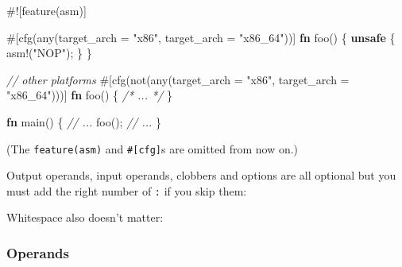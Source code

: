 \documentclass[a4paper,]{book}
\newenvironment{Shaded}{\begin{snugshade}}{\end{snugshade}}
\newcommand{\KeywordTok}[1]{\textcolor[rgb]{0.13,0.29,0.53}{\textbf{{#1}}}}
\newcommand{\StringTok}[1]{\textcolor[rgb]{0.31,0.60,0.02}{{#1}}}
\newcommand{\CommentTok}[1]{\textcolor[rgb]{0.56,0.35,0.01}{\textit{{#1}}}}
\newcommand{\OtherTok}[1]{\textcolor[rgb]{0.56,0.35,0.01}{{#1}}}
\newcommand{\NormalTok}[1]{{#1}}
\begin{document}
\begin{Shaded}
\begin{Highlighting}[]
\NormalTok{#![feature(asm)]}

\OtherTok{#[}\NormalTok{cfg}\OtherTok{(}\NormalTok{any}\OtherTok{(}\NormalTok{target_arch }\OtherTok{=} \StringTok{"x86"}\OtherTok{,} \NormalTok{target_arch }\OtherTok{=} \StringTok{"x86_64"}\OtherTok{))]}
\KeywordTok{fn} \NormalTok{foo() \{}
    \KeywordTok{unsafe} \NormalTok{\{}
        \OtherTok{asm!}\NormalTok{(}\StringTok{"NOP"}\NormalTok{);}
    \NormalTok{\}}
\NormalTok{\}}

\CommentTok{// other platforms}
\OtherTok{#[}\NormalTok{cfg}\OtherTok{(}\NormalTok{not}\OtherTok{(}\NormalTok{any}\OtherTok{(}\NormalTok{target_arch }\OtherTok{=} \StringTok{"x86"}\OtherTok{,} \NormalTok{target_arch }\OtherTok{=} \StringTok{"x86_64"}\OtherTok{)))]}
\KeywordTok{fn} \NormalTok{foo() \{ }\CommentTok{/* ... */} \NormalTok{\}}

\KeywordTok{fn} \NormalTok{main() \{}
    \CommentTok{// ...}
    \NormalTok{foo();}
    \CommentTok{// ...}
\NormalTok{\}}
\end{Highlighting}
\end{Shaded}

(The \texttt{feature(asm)} and \texttt{\#{[}cfg{]}}s are omitted from
now on.)

Output operands, input operands, clobbers and options are all optional
but you must add the right number of \texttt{:} if you skip them:

\begin{Shaded}
\end{Shaded}

Whitespace also doesn't matter:

\begin{Shaded}
\end{Shaded}

\subsubsection{Operands}\label{operands}
\end{document}
